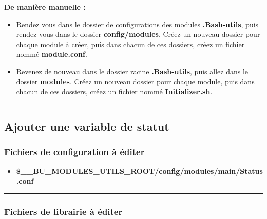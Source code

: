 \documentclass[a4paper,10pt]{article}
\begin{document}
\textbf{De manière manuelle :}
\begin{itemize}
    \item  Rendez vous dans le dossier de configurations des modules \textbf{\color{lime}.Bash-utils}, puis rendez vous dans
    le dossier \textbf{\color{lime}config/modules}. Créez un nouveau dossier pour chaque module à créer, puis dans chacun de ces dossiers, créez un fichier nommé \textbf{\color{lime}module.conf}.\\[1\baselineskip]

    \item Revenez de nouveau dans le dossier racine \textbf{\color{lime}.Bash-utils}, puis allez dans le dossier \textbf{\color{lime}modules}.\linebreak
    Créez un nouveau dossier pour chaque module, puis dans chacun de ces dossiers, créez un fichier nommé \textbf{\color{lime}Initializer.sh}.\\[1\baselineskip]
\end{itemize}




\color{green}\par\noindent\rule{\textwidth}{0.4pt}\color{white}

\color{green}
\subsection{Ajouter une variable de statut}\color{white}

\color{blue}
\subsubsection{Fichiers de configuration à éditer}\color{white}

\begin{itemize}
    \item \textbf{\color{orange}\$\_\_BU\_MODULES\_UTILS\_ROOT\color{lime}/config/modules/main/Status.conf}\\[1\baselineskip]
\end{itemize}



\color{blue}\par\noindent\rule{\textwidth}{0.4pt}\color{white}

\color{blue}
\subsubsection{Fichiers de librairie à éditer}\color{white}
\end{document}
